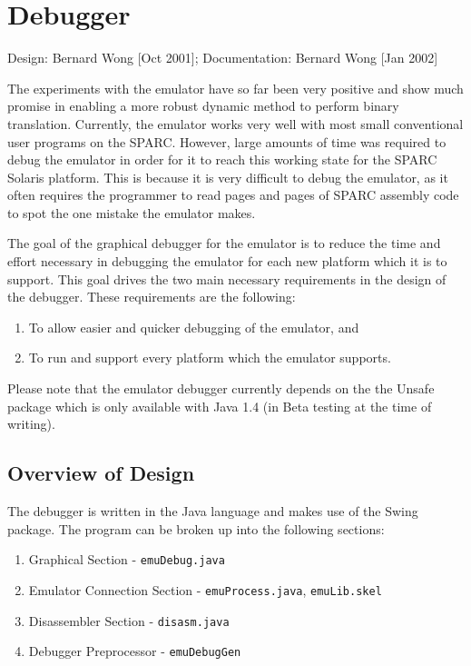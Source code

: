 \chapter{Debugger}
\label{ch-debugger}

{\small
\begin{flushright}
Design: Bernard Wong [Oct 2001]; Documentation: Bernard Wong [Jan 2002]
\end{flushright}
}

The experiments with the emulator have so far been very positive and show much 
promise in enabling a more robust dynamic method to perform binary translation. 
Currently, the emulator works very well with most small conventional user 
programs on the SPARC. However, large amounts of time was required to debug the 
emulator in order for it to reach this working state for the SPARC Solaris 
platform. This is because it is very difficult to debug the emulator, as it 
often requires the programmer to read pages and pages of SPARC assembly code 
to spot the one mistake the emulator makes. 

The goal of the graphical debugger for the emulator is to reduce the time and 
effort necessary in debugging the emulator for each new platform which it is to 
support. This goal drives the two main necessary requirements in the design of 
the debugger. These requirements are the following:

\begin{enumerate}
\item To allow easier and quicker debugging of the emulator, and  
\item To run and support every platform which the emulator supports.
\end{enumerate}

Please note that the emulator debugger currently depends on the the Unsafe 
package which is only available with Java 1.4 (in Beta testing at the 
time of writing).


\section{Overview of Design}

The debugger is written in the Java language and makes use of the Swing 
package. The program can be broken up into the following sections:

\begin{enumerate}
\item Graphical Section - \texttt{emuDebug.java}
\item Emulator Connection Section - \texttt{emuProcess.java}, 
		\texttt{emuLib.skel}
\item Disassembler Section - \texttt{disasm.java}
\item Debugger Preprocessor - \texttt{emuDebugGen} 
\end{enumerate}


